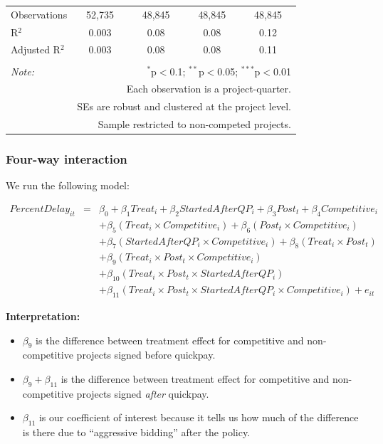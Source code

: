 \documentclass[
]{article}
\providecommand{\tightlist}{%
  \setlength{\itemsep}{0pt}\setlength{\parskip}{0pt}}
\begin{document}
\begin{table}[H]
\begin{tabular}{@{\extracolsep{-2pt}}lcccc}
Observations & 52,735 & 48,845 & 48,845 & 48,845 \\ 
R$^{2}$ & 0.003 & 0.08 & 0.08 & 0.12 \\ 
Adjusted R$^{2}$ & 0.003 & 0.08 & 0.08 & 0.11 \\ 
\hline 
\hline \\[-1.8ex] 
\textit{Note:}  & \multicolumn{4}{r}{$^{*}$p$<$0.1; $^{**}$p$<$0.05; $^{***}$p$<$0.01} \\ 
 & \multicolumn{4}{r}{Each observation is a project-quarter.} \\ 
 & \multicolumn{4}{r}{SEs are robust and clustered at the project level.} \\ 
 & \multicolumn{4}{r}{Sample restricted to non-competed projects.} \\ 
\end{tabular} 
\end{table}

\hypertarget{four-way-interaction}{%
\subsubsection{Four-way interaction}\label{four-way-interaction}}

We run the following model:

\[\begin{aligned} PercentDelay_{it} &=& \beta_0 +\beta_1 Treat_i+ \beta_2 StartedAfterQP_i+ \beta_3 Post_t+ \beta_4 Competitive_i\\ && +  \beta_5 (Treat_i \times Competitive_i) + \beta_6 (Post_t \times Competitive_i)\\ && +  \beta_7 (StartedAfterQP_i \times Competitive_i) +\beta_8 (Treat_i \times Post_t)\\ && + \beta_9 (Treat_i \times Post_t \times Competitive_i) \\ && + \beta_{10} (Treat_i \times Post_t \times StartedAfterQP_i )\\ && + \beta_{11} (Treat_i \times Post_t \times StartedAfterQP_i \times Competitive_i) + e_{it} \end{aligned}\]

\textbf{Interpretation:}

\begin{itemize}
\tightlist
\item
  \(\beta_9\) is the difference between treatment effect for competitive
  and non-competitive projects signed before quickpay.
\item
  \(\beta_9 + \beta_{11}\) is the difference between treatment effect
  for competitive and non-competitive projects signed \emph{after}
  quickpay.
\item
  \(\beta_{11}\) is our coefficient of interest because it tells us how
  much of the difference is there due to ``aggressive bidding'' after
  the policy.
\end{itemize}
\end{document}
